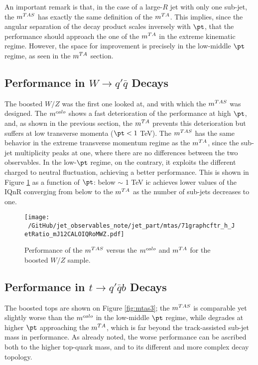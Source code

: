 An important remark is that, in the case of a large-$R$ jet with only one sub-jet, the $\mtas$ has exactly the same definition of the $m^{TA}$. This implies, since the angular separation of the decay product scales inversely with $\pt$, that the performance should approach the one of the $m^{TA}$ in the extreme kinematic regime. However, the space for improvement is precisely in the low-middle $\pt$ regime, as seen in the $m^{TA}$ section.

\subsection{Performance in $W \to q'\bar{q}$ Decays}
The boosted $W/Z$ was the first one looked at, and with which the $\mtas$ was designed. The $m^{calo}$ shows a fast deterioration of the performance at high $\pt$, and, as shown in the previous section, the $m^{TA}$ prevents this deterioration but suffers at low transverse momenta ($\pt<1$ TeV).
The $\mtas$ has the same behavior in the extreme transverse momentum regime as the $m^{TA}$, since the sub-jet multiplicity peaks at one, where there are no differences between the two observables.
In the low-$\pt$ regime, on the contrary, it exploits the different charged to neutral fluctuation, achieving a better performance.
This is shown in Figure \ref{fig:mtas2} as a function of $\pt$: below $\sim$ 1 TeV ic achieves lower values of the IQnR converging from below to the $m^{TA}$ as the number of sub-jets decreases to one.

\begin{figure}[!ht]
  \centering
      \texttt{[image: ~/GitHub/jet\_observables\_note/jet\_part/mtas/71graphcftr\_h\_JetRatio\_mJ12CALOIQRoMWZ.pdf]}
  \caption[$\mtas$ for boosted $W/Z$]{Performance of the $\mtas$ versus the $m^{calo}$ and $m^{TA}$ for the boosted $W/Z$ sample.}
  \label{fig:mtas2}
\end{figure}

\subsection{Performance in $t\to q'\bar{q}b$ Decays}
The boosted tops are shown on Figure \ref{fig:mtas3}; the $\mtas$ is comparable yet slightly worse than the $m^{calo}$ in the low-middle $\pt$ regime, while degrades at higher $\pt$ approaching the $m^{TA}$, which is far beyond the track-assisted sub-jet mass in performance.
As already noted, the worse performance can be ascribed both to the higher top-quark mass, and to its different and more complex decay topology.


